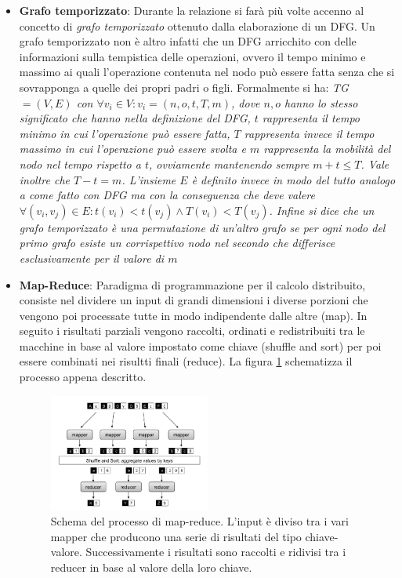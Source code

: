 \documentclass[]{IEEEtran}
\begin{document}
\begin{itemize}
	\item \textbf{Grafo temporizzato}: Durante la relazione si farà più volte accenno al concetto di \emph{grafo temporizzato} ottenuto dalla elaborazione di un DFG. Un grafo temporizzato non è altro infatti che un DFG arricchito con delle informazioni sulla tempistica delle operazioni, ovvero il tempo minimo e massimo ai quali l'operazione contenuta nel nodo può essere fatta senza che si sovrapponga a quelle dei propri padri o figli. Formalmente si ha:
	\it{TG} \normalfont $=(V,E)$ con $\forall v_i\in V : v_i = (n,o,t,T,m)$, dove $n,o$ hanno lo stesso significato che hanno nella definizione del DFG, $t$ rappresenta il tempo \emph{minimo} in cui l'operazione può essere fatta, $T$ rappresenta invece il tempo \emph{massimo} in cui l'operazione può essere svolta e $m$ rappresenta la mobilità del nodo nel tempo rispetto a $t$, ovviamente mantenendo sempre $m+t\le T$. Vale inoltre che $T - t = m$. L'insieme $E$ è definito invece in modo del tutto analogo a come fatto con DFG ma con la conseguenza che deve valere $\forall (v_i,v_j) \in E : t(v_i)<t(v_j) \land T(v_i)<T(v_j)$.
	Infine si dice che un grafo temporizzato è una \emph{permutazione} di un'altro grafo se per ogni nodo del primo grafo esiste un corrispettivo nodo nel secondo che differisce esclusivamente per il valore di $m$
	
	\item \textbf{Map-Reduce}\cite{MAPRED}: Paradigma di programmazione per il calcolo distribuito, consiste nel dividere un input di grandi dimensioni i diverse porzioni che vengono poi processate tutte in modo indipendente dalle altre (map). In seguito i risultati parziali vengono raccolti, ordinati e redistribuiti tra le macchine in base al valore impostato come chiave (shuffle and sort) per poi essere combinati nei risultti finali (reduce). La figura \ref{mapred} schematizza il processo appena descritto.
	\begin{figure}[htp]
		\centering
		\includegraphics[width=0.5\textwidth]{images/mapred.png}
		\caption{Schema del processo di map-reduce. L'input è diviso tra i vari mapper che producono una serie di risultati del tipo chiave-valore. Successivamente i risultati sono raccolti e ridivisi tra i reducer in base al valore della loro chiave.}
		\label{mapred}
	\end{figure}
	

\end{itemize}
\end{document}
